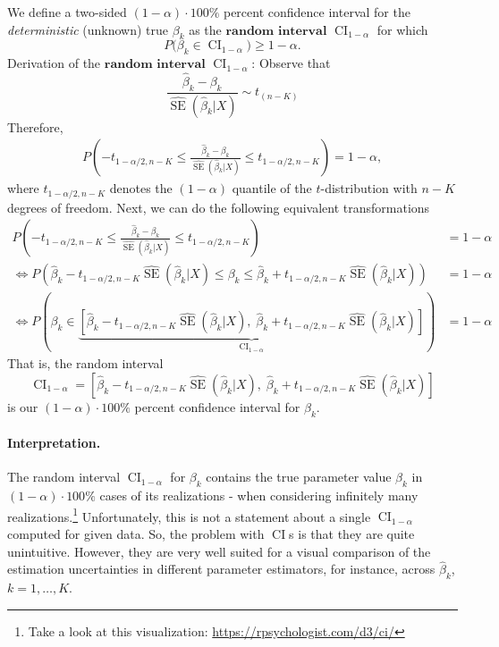 \documentclass[
  14pt,
]{memoir}
\begin{document}
We define a two-sided \((1-\alpha)\cdot 100\%\) percent confidence interval for the \emph{deterministic} (unknown) true \(\beta_k\) as the \(\textbf{random interval}\) \(\operatorname{CI}_{1-\alpha}\) for which
\[
P\Big(\beta_k\in\operatorname{CI}_{1-\alpha}\Big)\geq 1-\alpha.
\]
Derivation of the \(\textbf{random interval}\) \(\operatorname{CI}_{1-\alpha}\): Observe that
\[
\frac{\hat\beta_k-\beta_k}{\widehat{\operatorname{SE}}(\hat\beta_k|X)}\sim t_{(n-K)}
\]
Therefore,
\begin{align*}
P\left(-t_{1-\alpha/2,n-K}\leq\frac{\hat\beta_k-\beta_k}{\widehat{\operatorname{SE}}(\hat\beta_k|X)}\leq t_{1-\alpha/2,n-K}\right)=1-\alpha,
\end{align*}
where \(t_{1-\alpha/2,n-K}\) denotes the \((1-\alpha)\) quantile of the \(t\)-distribution with \(n-K\) degrees of freedom. Next, we can do the following equivalent transformations
\begin{align*}
P\left(-t_{1-\alpha/2,n-K}\leq\frac{\hat\beta_k-\beta_k}{\widehat{\operatorname{SE}}(\hat\beta_k|X)}\leq t_{1-\alpha/2,n-K}\right)&=1-\alpha\\
\Leftrightarrow P\left(\hat\beta_k-t_{1-\alpha/2,n-K}\widehat{\operatorname{SE}}(\hat\beta_k|X)\leq \beta_k\leq\hat\beta_k +t_{1-\alpha/2,n-K}\widehat{\operatorname{SE}}(\hat\beta_k|X)\right)&=1-\alpha\\
\Leftrightarrow P\left(\beta_k\in\underbrace{\left[\hat\beta_k-t_{1-\alpha/2,n-K}\widehat{\operatorname{SE}}(\hat\beta_k|X),\;\hat\beta_k +t_{1-\alpha/2,n-K}\widehat{\operatorname{SE}}(\hat\beta_k|X)\right]}_{\operatorname{CI}_{1-\alpha}}\right)&=1-\alpha
\end{align*}
That is, the random interval
\[
\operatorname{CI}_{1-\alpha}=\left[\hat\beta_k-t_{1-\alpha/2,n-K}\widehat{\operatorname{SE}}(\hat\beta_k|X),\;\hat\beta_k +t_{1-\alpha/2,n-K}\widehat{\operatorname{SE}}(\hat\beta_k|X)\right]
\]
is our \((1-\alpha)\cdot 100\%\) percent confidence interval for \(\beta_k\).

\paragraph*{Interpretation.}

The random interval \(\operatorname{CI}_{1-\alpha}\) for \(\beta_k\) contains the true parameter value \(\beta_k\) in \((1-\alpha)\cdot 100\%\) cases of its realizations - when considering infinitely many realizations.\footnote{Take a look at this visualization: \url{https://rpsychologist.com/d3/ci/}} Unfortunately, this  is not a statement about a single \(\operatorname{CI}_{1-\alpha}\) computed for given data. So, the problem with \(\operatorname{CI}\)s is that they are quite unintuitive. However, they are very well suited for a visual comparison of the estimation uncertainties in different parameter estimators, for instance, across \(\hat\beta_k\), \(k=1,\dots,K\).
\end{document}
